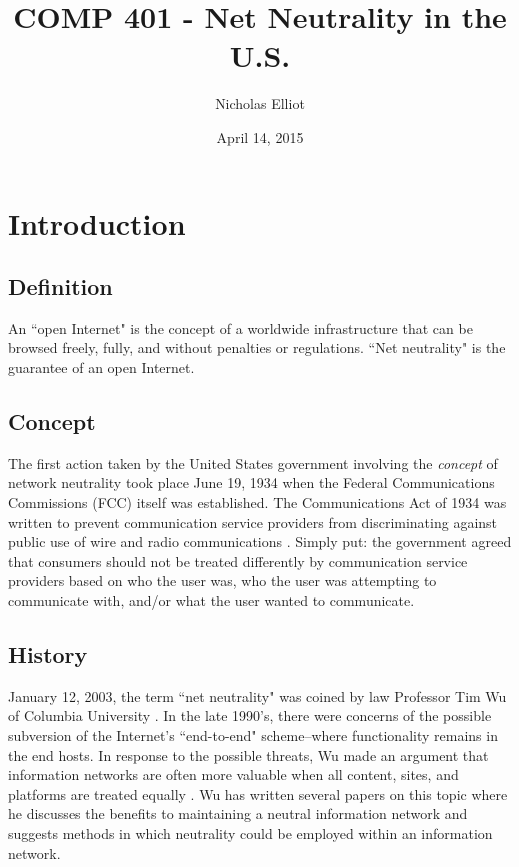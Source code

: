 \documentclass[11pt]{article}
\begin{document}
\title{COMP 401 - Net Neutrality in the U.S.}
\author{Nicholas Elliot}
\date{April 14, 2015}
\maketitle


\section{Introduction}
\subsection{Definition}
An ``open Internet" is the concept of a worldwide infrastructure that can be browsed freely, fully, and without penalties or regulations.  ``Net neutrality" is the guarantee of an open Internet.

\subsection{Concept}
The first action taken by the United States government involving the \emph{concept} of network neutrality took place June 19, 1934 when the Federal Communications Commissions (FCC) itself was established.  The Communications Act of 1934 was written to prevent communication service providers from discriminating against public use of wire and radio communications \cite{ComAct}.  Simply put: the government agreed that consumers should not be treated differently by communication service providers based on who the user was, who the user was attempting to communicate with, and/or what the user wanted to communicate.

\subsection{History}
January 12, 2003, the term ``net neutrality" was coined by law Professor Tim Wu of Columbia University \cite{ComAct}.  In the late 1990's, there were concerns of the possible subversion of the Internet's ``end-to-end" scheme--where functionality remains in the end hosts.  In response to the possible threats, Wu made an argument that information networks are often more valuable when all content, sites, and platforms are treated equally \cite{Wu}.  Wu has written several papers on this topic where he discusses the benefits to maintaining a neutral information network and suggests methods in which neutrality could be employed within an information network.
\end{document}
